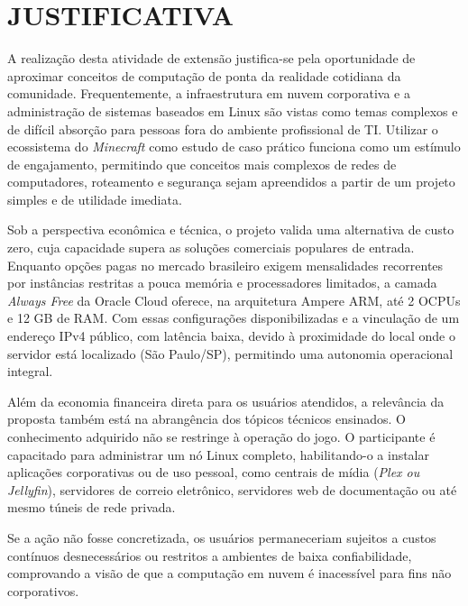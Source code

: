 
\chapter{JUSTIFICATIVA}
\label{capitulo-justificativa}
A realização desta atividade de extensão justifica-se pela oportunidade de aproximar conceitos de computação de ponta da realidade cotidiana da comunidade. Frequentemente, a infraestrutura em nuvem corporativa e a administração de sistemas baseados em Linux são vistas como temas complexos e de difícil absorção para pessoas fora do ambiente profissional de TI. Utilizar o ecossistema do \textit{Minecraft} como estudo de caso prático funciona como um estímulo de engajamento, permitindo que conceitos mais complexos de redes de computadores, roteamento e segurança sejam apreendidos a partir de um projeto simples e de utilidade imediata.

Sob a perspectiva econômica e técnica, o projeto valida uma alternativa de custo zero, cuja capacidade supera as soluções comerciais populares de entrada. Enquanto opções pagas no mercado brasileiro exigem mensalidades recorrentes por instâncias restritas a pouca memória e processadores limitados, a camada \textit{Always Free} da Oracle Cloud oferece, na arquitetura Ampere ARM, até 2 OCPUs e 12 GB de RAM. Com essas configurações disponibilizadas e a vinculação de um endereço IPv4 público, com latência baixa, devido à proximidade do local onde o servidor está localizado (São Paulo/SP), permitindo uma autonomia operacional integral.

Além da economia financeira direta para os usuários atendidos, a relevância da proposta também está na abrangência dos tópicos técnicos ensinados. O conhecimento adquirido não se restringe à operação do jogo. O participante é capacitado para administrar um nó Linux completo, habilitando-o a instalar aplicações corporativas ou de uso pessoal, como centrais de mídia (\textit{Plex ou Jellyfin}), servidores de correio eletrônico, servidores web de documentação ou até mesmo túneis de rede privada.

Se a ação não fosse concretizada, os usuários permaneceriam sujeitos a custos contínuos desnecessários ou restritos a ambientes de baixa confiabilidade, comprovando a visão de que a computação em nuvem é inacessível para fins não corporativos.